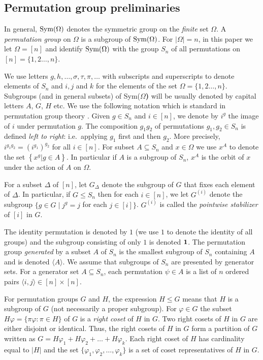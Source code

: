\documentclass{article}
\newcommand{\Sym}[1]{{\rm Sym(}#1{\bf )}}
\renewcommand{\angle}[1]{\langle #1\rangle}
\begin{document}
\subsection{Permutation group preliminaries}

In general, $\Sym\Omega$ denotes the symmetric group on the {\em
  finite} set $\Omega$. A {\em permutation group} on $\Omega$ is a
subgroup of $\Sym\Omega$. For $|\Omega|=n$, in this paper we let
$\Omega=[n]$ and identify $\Sym\Omega$ with the group $S_n$ of all
permutations on $[n]=\{1,2\ldots,n\}$.

We use letters $g,h,\ldots,\sigma,\tau ,\pi,\dots$ with subscripts and
superscripts to denote elements of $S_n$ and $i,j$ and $k$ for the
elements of the set $\Omega=\{1,2\ldots,n\}$.  Subgroups (and in
general subsets) of \Sym{$\Omega$} will be usually denoted by capital
letters $A$, $G$, $H$ etc. We use the following notation which is
standard in permutation group theory
\cite{wielandt64finite,luks93permutation}.  Given $g\in S_n$ and
$i\in[n]$, we denote by $i^g$ the image of $i$ under permutation $g$.
The composition $g_1g_2$ of permutations $g_1, g_2\in S_n$ is defined
{\em left to right}: i.e.\ applying $g_1$ first and then $g_2$. More
precisely, $i^{g_1g_2}=(i^{g_1})^{g_2}$ for all $i\in[n]$.  For subset
$A \subseteq S_n$ and $x \in \Omega$ we use $x^A$ to denote the set
$\left\{ x^g | g \in A \right\}$. In particular if $A$ is a subgroup
of $S_n$, $x^A$ is the orbit of $x$ under the action of $A$ on
$\Omega$.

For a subset $\Delta$ of $[n]$, let $G_{\Delta}$ denote the subgroup
of $G$ that fixes each element of $\Delta$. In particular, if $G\leq
S_n$ then for each $i\in[n]$, we let $G^{(i)}$ denote the subgroup
$\{g\in G\mid j^g=j$ for each $j\in[i]\}$. $G^{(i)}$ is called the
{\em pointwise stabilizer} of $[i]$ in $G$. 

The identity permutation is denoted by $1$ (we use $1$ to denote the
identity of all groups) and the subgroup consisting of only $1$ is
denoted ${\bf 1}$. The permutation group {\em generated} by a subset $A$ of
$S_n$ is the smallest subgroup of $S_n$ containing $A$ and is denoted
$\angle{A}$. We assume that subgroups of $S_n$ are presented by
generator sets. For a generator set $A\subseteq S_n$, each permutation
$\psi\in A$ is a list of $n$ ordered pairs $\angle{i,j}\in[n]\times
[n]$.

For permutation groups $G$ and $H$, the expression $H\leq G$ means
that $H$ is a subgroup of $G$ (not necessarily a proper subgroup). For
$\varphi\in G$ the subset $H\varphi=\{\pi\varphi:\pi\in H\}$ of $G$ is
a {\em right coset} of $H$ in $G$. Two right cosets of $H$ in $G$ are
either disjoint or identical. Thus, the right cosets of $H$ in $G$
form a partition of $G$ written as $G=H\varphi_1+H\varphi_2
+\dots+H\varphi_k$. Each right coset of $H$ has cardinality equal to
$|H|$ and the set $\{\varphi_1,\varphi_2,\dots,\varphi_k\}$ is a set
of coset representatives of $H$ in $G$.
\end{document}
